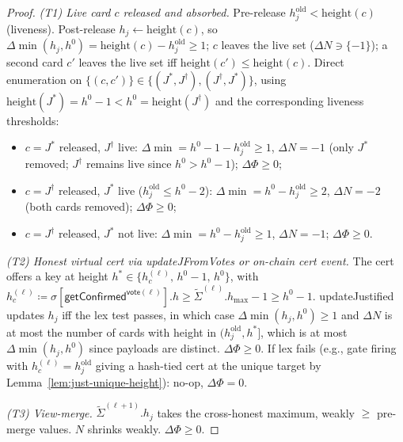 \ifx\litemode\undefined\documentclass{article}\fi
\newcommand{\hmax}{\ensuremath{h_{\max}}\xspace}
\newcommand{\updateJFromVotes}{\textsf{updateJFromVotes}\xspace}
\newcommand{\vote}{\ensuremath{\mathsf{vote}}}
\newcommand{\comm}[1]{\ensuremath{\widetilde{#1}}}
\newcommand{\updateJustified}{\textsf{updateJustified}\xspace}
\newcommand{\getConfirmed}{\textsf{getConfirmed}\xspace}
\theoremstyle{plain}
\theoremstyle{definition}
\theoremstyle{remark}
\begin{document}
\begin{proof}
\emph{(T1) Live card $c$ released and absorbed.}
Pre-release $h_j^{\mathrm{old}} < \mathrm{height}(c)$ (liveness). Post-release $h_j \gets \mathrm{height}(c)$, so $\Delta \min(h_j, h^0) = \mathrm{height}(c) - h_j^{\mathrm{old}} \geq 1$; $c$ leaves the live set ($\Delta N \ni \{-1\}$); a second card $c'$ leaves the live set iff $\mathrm{height}(c') \leq \mathrm{height}(c)$.
Direct enumeration on $\{(c, c')\} \in \{(J^*, J^\dagger), (J^\dagger, J^*)\}$, using $\mathrm{height}(J^*) = h^0 - 1 < h^0 = \mathrm{height}(J^\dagger)$ and the corresponding liveness thresholds:
\begin{itemize}
  \item $c = J^*$ released, $J^\dagger$ live: $\Delta \min = h^0 - 1 - h_j^{\mathrm{old}} \geq 1$, $\Delta N = -1$ (only $J^*$ removed; $J^\dagger$ remains live since $h^0 > h^0 - 1$); $\Delta \Phi \geq 0$;
  \item $c = J^\dagger$ released, $J^*$ live ($h_j^{\mathrm{old}} \leq h^0 - 2$): $\Delta \min = h^0 - h_j^{\mathrm{old}} \geq 2$, $\Delta N = -2$ (both cards removed); $\Delta \Phi \geq 0$;
  \item $c = J^\dagger$ released, $J^*$ not live: $\Delta \min = h^0 - h_j^{\mathrm{old}} \geq 1$, $\Delta N = -1$; $\Delta \Phi \geq 0$.
\end{itemize}

\emph{(T2) Honest virtual cert via \updateJFromVotes{} or on-chain cert event.}
The cert offers a key at height $h^* \in \{h_c^{(\ell)},\, h^0 - 1,\, h^0\}$, with $h_c^{(\ell)} \coloneqq \sigma[\getConfirmed^{\vote(\ell)}].h \geq \comm{\Sigma}^{(\ell)}.\hmax - 1 \geq h^0 - 1$.
\updateJustified{} updates $h_j$ iff the lex test passes, in which case $\Delta \min(h_j, h^0) \geq 1$ and $\Delta N$ is at most the number of cards with height in $(h_j^{\mathrm{old}}, h^*]$, which is at most $\Delta \min(h_j, h^0)$ since payloads are distinct.
$\Delta \Phi \geq 0$.
If lex fails (e.g., gate firing with $h_c^{(\ell)} = h_j^{\mathrm{old}}$ giving a hash-tied cert at the unique target by Lemma~\ref{lem:just-unique-height}): no-op, $\Delta \Phi = 0$.

\emph{(T3) View-merge.}
$\comm{\Sigma}^{(\ell+1)}.h_j$ takes the cross-honest maximum, weakly $\geq$ pre-merge values.
$N$ shrinks weakly. $\Delta \Phi \geq 0$.


\end{proof}
\end{document}
